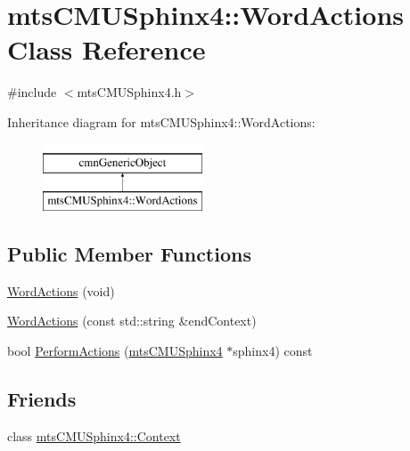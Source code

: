 \hypertarget{classmts_c_m_u_sphinx4_1_1_word_actions}{\section{mts\-C\-M\-U\-Sphinx4\-:\-:Word\-Actions Class Reference}
\label{classmts_c_m_u_sphinx4_1_1_word_actions}
}


{\ttfamily \#include $<$mts\-C\-M\-U\-Sphinx4.\-h$>$}

Inheritance diagram for mts\-C\-M\-U\-Sphinx4\-:\-:Word\-Actions\-:\begin{figure}[H]
\begin{center}
\leavevmode
\includegraphics[height=2.000000cm]{dd/dad/classmts_c_m_u_sphinx4_1_1_word_actions}
\end{center}
\end{figure}
\subsection*{Public Member Functions}
\begin{DoxyCompactItemize}
\item 
\hyperlink{classmts_c_m_u_sphinx4_1_1_word_actions_aa58deb353866af6d9515b58593c56aaa}{Word\-Actions} (void)
\item 
\hyperlink{classmts_c_m_u_sphinx4_1_1_word_actions_ad754ad85c076548d99840b48602953ae}{Word\-Actions} (const std\-::string \&end\-Context)
\item 
bool \hyperlink{classmts_c_m_u_sphinx4_1_1_word_actions_a72eda95436b175043bfd8291824b81a8}{Perform\-Actions} (\hyperlink{classmts_c_m_u_sphinx4}{mts\-C\-M\-U\-Sphinx4} $\ast$sphinx4) const 
\end{DoxyCompactItemize}
\subsection*{Friends}
\begin{DoxyCompactItemize}
\item 
class \hyperlink{classmts_c_m_u_sphinx4_1_1_word_actions_af6840ef284029e7e225d11062c8615e3}{mts\-C\-M\-U\-Sphinx4\-::\-Context}
\end{DoxyCompactItemize}



